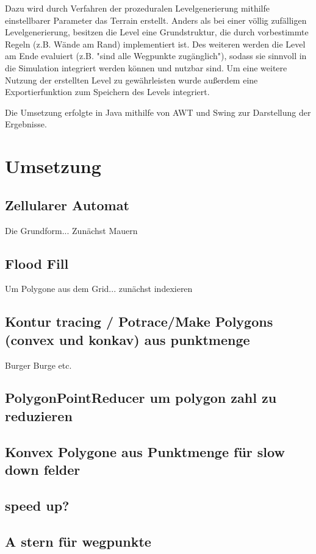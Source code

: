 \documentclass[10pt,a4paper]{article}
\begin{document}
Dazu wird durch Verfahren der prozeduralen Levelgenerierung mithilfe einstellbarer Parameter das Terrain erstellt. Anders als bei einer völlig zufälligen Levelgenerierung, besitzen die Level eine Grundstruktur, die durch vorbestimmte Regeln (z.B. Wände am Rand) implementiert ist. Des weiteren werden die Level am Ende evaluiert (z.B. "sind alle Wegpunkte zugänglich"), sodass sie sinnvoll in die Simulation integriert werden können und nutzbar sind. Um eine weitere Nutzung der erstellten Level zu gewährleisten wurde außerdem eine Exportierfunktion zum Speichern des Levels integriert.

Die Umsetzung erfolgte in Java mithilfe von AWT und Swing zur Darstellung der Ergebnisse.

\section{Umsetzung}
\subsection{Zellularer Automat}
Die Grundform... Zunächst Mauern

\subsection{Flood Fill}
Um Polygone aus dem Grid... zunächst indexieren


\subsection{Kontur tracing / Potrace/Make Polygons (convex und konkav) aus punktmenge}
Burger Burge etc.

\subsection{PolygonPointReducer um polygon zahl zu reduzieren}

\subsection{Konvex Polygone aus Punktmenge für slow down felder}

\subsection{speed up?}

\subsection{A stern für wegpunkte}
\end{document}
